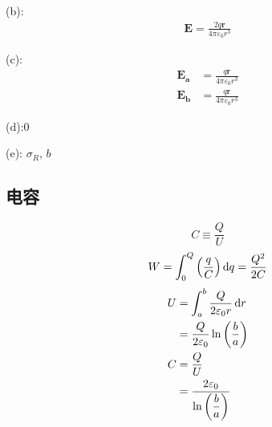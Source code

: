 (b):
\begin{align*}
    \boldsymbol{E}=\frac{2q\boldsymbol{r}}{4\pi\varepsilon_0 r^3}
\end{align*}

(c):
\begin{align*}
    \boldsymbol{E_a}&=\frac{q\boldsymbol{r}}{4\pi\varepsilon_0 r^3}\\
    \boldsymbol{E_b}&=\frac{q\boldsymbol{r}}{4\pi\varepsilon_0 r^3}
\end{align*}

(d):0

(e): $\sigma_R, \,b$

\subsection{电容}
\begin{equation}
    C\equiv\frac{Q}{U}
\end{equation}
\begin{equation}
    W=\int_{0}^{Q}\left(\frac{q}{C}\right)\dif q=\frac{Q^2}{2C}
\end{equation}
\begin{align*}
    U&=\int_{a}^{b}\frac{Q}{2\varepsilon_0 r}\dif r\\
    &=\frac{Q}{2\varepsilon_0}\ln\left(\frac{b}{a}\right)\\
    C&=\frac{Q}{U}\\
    &=\frac{2\varepsilon_0}{\ln\left(\dfrac{b}{a}\right)}
\end{align*}
